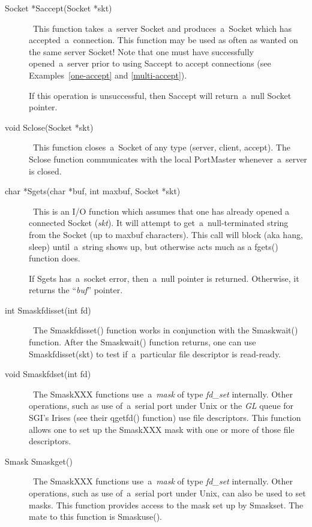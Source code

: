 \documentclass[12pt]{article}
\begin{document}
\begin{description}

\item[Socket *Saccept(Socket *skt)] \     This function takes~a~server Socket and produces~a~Socket which has
    accepted~a~connection.  This function may be used as often as wanted on the
    same server Socket!  Note that one must have successfully opened~a~server
    prior to using Saccept to accept connections (see Examples~\ref{one-accept}
    and \ref{multi-accept}).

    If this operation is unsuccessful, then Saccept will return~a~null Socket
    pointer.

\item[void Sclose(Socket *skt)] \     This function closes~a~Socket of any type (server, client, accept).  The
    Sclose function communicates with the local PortMaster whenever~a~server is
    closed.

\item[char *Sgets(char *buf, int maxbuf, Socket *skt)] \     This is an I/O function which assumes that one has already opened a
    connected Socket ({\em skt}).  It will attempt to get~a~null-terminated
    string from the Socket (up to maxbuf characters).  This call will block
    (aka hang, sleep) until~a~string shows up, but otherwise acts much as a
    fgets() function does.

    If Sgets has~a~socket error, then~a~null pointer is returned.  Otherwise,
    it returns the ``{\em buf}'' pointer.

\item[int Smaskfdisset(int fd)] \     The Smaskfdisset() function works in conjunction with the Smaskwait()
    function.  After the Smaskwait() function returns, one can use
    Smaskfdisset(skt) to test if~a~particular file descriptor is read-ready.

\item[void Smaskfdset(int fd)] \     The Smask{\small XXX} functions use~a~{\it mask} of type {\it fd\_set}
    internally.  Other operations, such as use of~a~serial port under
    Unix or the {\small\it GL} queue for {\small SGI}'s Irises (see their
    qgetfd() function) use file descriptors.  This function allows one to
    set up the Smask{\small XXX} mask with one or more of those file
    descriptors.

\item[Smask Smaskget()] \     The Smask{\small XXX} functions use~a~{\it mask} of type {\it fd\_set}
    internally.  Other operations, such as use of~a~serial port under
    Unix, can also be used to set masks.  This function provides access to
    the mask set up by Smaskset.  The mate to this function is Smaskuse().


\end{description}
\end{document}
